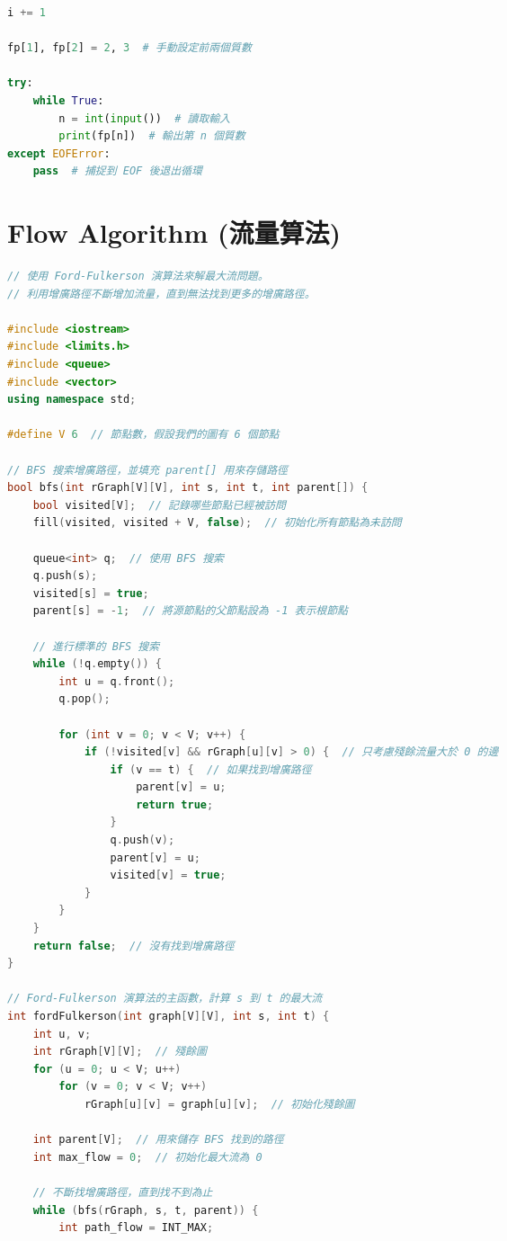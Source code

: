 \documentclass{article}
\begin{document}
\begin{multicols}{2}
\begin{lstlisting}[language=Python]
    i += 1

fp[1], fp[2] = 2, 3  # 手動設定前兩個質數

try:
    while True:
        n = int(input())  # 讀取輸入
        print(fp[n])  # 輸出第 n 個質數
except EOFError:
    pass  # 捕捉到 EOF 後退出循環
\end{lstlisting}

\section{Flow Algorithm (流量算法)}

\begin{lstlisting}[language=C++]
// 使用 Ford-Fulkerson 演算法來解最大流問題。
// 利用增廣路徑不斷增加流量，直到無法找到更多的增廣路徑。

#include <iostream>
#include <limits.h>
#include <queue>
#include <vector>
using namespace std;

#define V 6  // 節點數，假設我們的圖有 6 個節點

// BFS 搜索增廣路徑，並填充 parent[] 用來存儲路徑
bool bfs(int rGraph[V][V], int s, int t, int parent[]) {
    bool visited[V];  // 記錄哪些節點已經被訪問
    fill(visited, visited + V, false);  // 初始化所有節點為未訪問

    queue<int> q;  // 使用 BFS 搜索
    q.push(s);
    visited[s] = true;
    parent[s] = -1;  // 將源節點的父節點設為 -1 表示根節點

    // 進行標準的 BFS 搜索
    while (!q.empty()) {
        int u = q.front();
        q.pop();

        for (int v = 0; v < V; v++) {
            if (!visited[v] && rGraph[u][v] > 0) {  // 只考慮殘餘流量大於 0 的邊
                if (v == t) {  // 如果找到增廣路徑
                    parent[v] = u;
                    return true;
                }
                q.push(v);
                parent[v] = u;
                visited[v] = true;
            }
        }
    }
    return false;  // 沒有找到增廣路徑
}

// Ford-Fulkerson 演算法的主函數，計算 s 到 t 的最大流
int fordFulkerson(int graph[V][V], int s, int t) {
    int u, v;
    int rGraph[V][V];  // 殘餘圖
    for (u = 0; u < V; u++)
        for (v = 0; v < V; v++)
            rGraph[u][v] = graph[u][v];  // 初始化殘餘圖

    int parent[V];  // 用來儲存 BFS 找到的路徑
    int max_flow = 0;  // 初始化最大流為 0

    // 不斷找增廣路徑，直到找不到為止
    while (bfs(rGraph, s, t, parent)) {
        int path_flow = INT_MAX;


\end{lstlisting}
\end{multicols}
\end{document}
